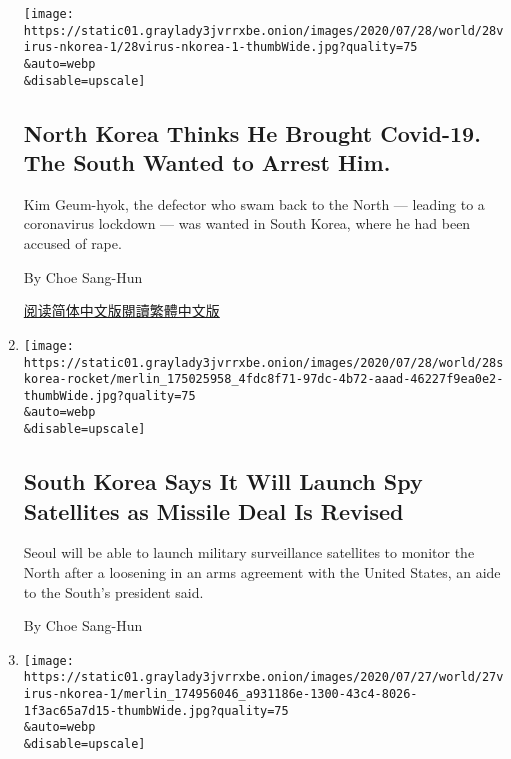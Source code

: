 \begin{enumerate}
  \texttt{[image: https://static01.graylady3jvrrxbe.onion/images/2020/07/28/world/28virus-nkorea-1/28virus-nkorea-1-thumbWide.jpg?quality=75\\\&auto=webp\\\&disable=upscale]}

  \hypertarget{north-korea-thinks-he-brought-covid-19-the-south-wanted-to-arrest-him}{%
  \subsection{North Korea Thinks He Brought Covid-19. The South Wanted
  to Arrest
  Him.}\label{north-korea-thinks-he-brought-covid-19-the-south-wanted-to-arrest-him}}

  Kim Geum-hyok, the defector who swam back to the North --- leading to
  a coronavirus lockdown --- was wanted in South Korea, where he had
  been accused of rape.

  By Choe Sang-Hun

  \href{https://cn.nytimes3xbfgragh.onion/asia-pacific/20200729/north-korea-defector-coronavirus/}{阅读简体中文版}\href{https://cn.nytimes3xbfgragh.onion/asia-pacific/20200729/north-korea-defector-coronavirus/zh-hant/}{閱讀繁體中文版}
\item
  \href{/2020/07/28/world/asia/south-korea-satellites-rockets.html}{}

  \texttt{[image: https://static01.graylady3jvrrxbe.onion/images/2020/07/28/world/28skorea-rocket/merlin\_175025958\_4fdc8f71-97dc-4b72-aaad-46227f9ea0e2-thumbWide.jpg?quality=75\\\&auto=webp\\\&disable=upscale]}

  \hypertarget{south-korea-says-it-will-launch-spy-satellites-as-missile-deal-is-revised}{%
  \subsection{South Korea Says It Will Launch Spy Satellites as Missile
  Deal Is
  Revised}\label{south-korea-says-it-will-launch-spy-satellites-as-missile-deal-is-revised}}

  Seoul will be able to launch military surveillance satellites to
  monitor the North after a loosening in an arms agreement with the
  United States, an aide to the South's president said.

  By Choe Sang-Hun
\item
  \href{/2020/07/27/world/asia/north-korea-defector-coronavirus.html}{}

  \texttt{[image: https://static01.graylady3jvrrxbe.onion/images/2020/07/27/world/27virus-nkorea-1/merlin\_174956046\_a931186e-1300-43c4-8026-1f3ac65a7d15-thumbWide.jpg?quality=75\\\&auto=webp\\\&disable=upscale]}


\end{enumerate}
